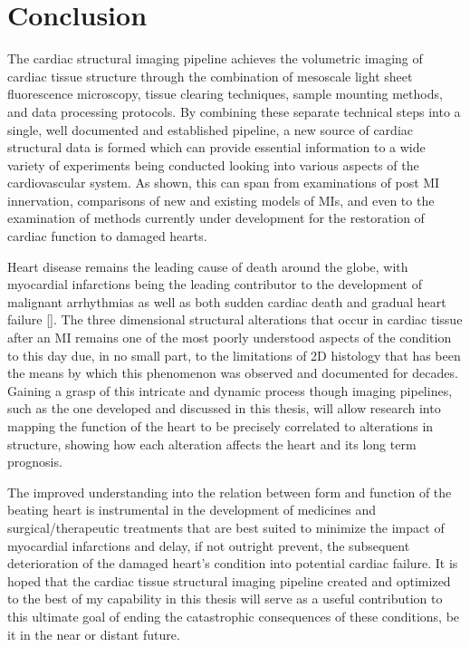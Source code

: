 \newpage
\section{Conclusion}

The cardiac structural imaging pipeline achieves the volumetric imaging of cardiac tissue structure through the combination of mesoscale light sheet fluorescence microscopy, tissue clearing techniques, sample mounting methods, and data processing protocols. By combining these separate technical steps into a single, well documented and established pipeline, a new source of cardiac structural data is formed which can provide essential information to a wide variety of experiments being conducted looking into various aspects of the cardiovascular system. As shown, this can span from examinations of post MI innervation, comparisons of new and existing models of MIs, and even to the examination of methods currently under development for the restoration of cardiac function to damaged hearts.

Heart disease remains the leading cause of death around the globe, with myocardial infarctions being the leading contributor to the development of malignant arrhythmias as well as both sudden cardiac death and gradual heart failure []. The three dimensional structural alterations that occur in cardiac tissue after an MI remains one of the most poorly understood aspects of the condition to this day due, in no small part, to the limitations of 2D histology that has been the means by which this phenomenon was observed and documented for decades. Gaining a grasp of this intricate and dynamic process though imaging pipelines, such as the one developed and discussed in this thesis, will allow research into mapping the function of the heart to be precisely correlated to alterations in structure, showing how each alteration affects the heart and its long term prognosis. 

The improved understanding into the relation between form and function of the beating heart is instrumental in the development of medicines and surgical/therapeutic treatments that are best suited to minimize the impact of myocardial infarctions and delay, if not outright prevent, the subsequent deterioration of the damaged heart's condition into potential cardiac failure. It is hoped that the cardiac tissue structural imaging pipeline created and optimized to the best of my capability in this thesis will serve as a useful contribution to this ultimate goal of ending the catastrophic consequences of these conditions, be it in the near or distant future.



